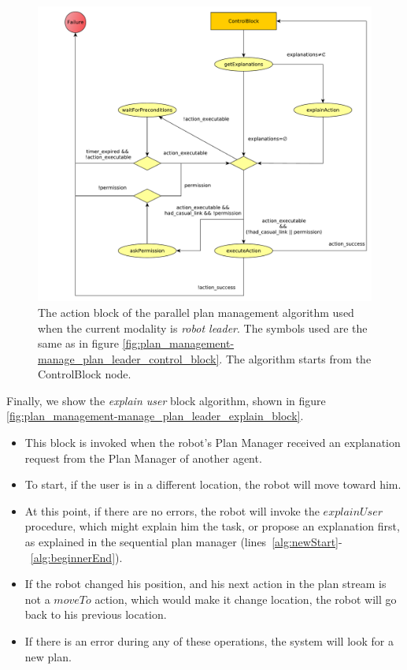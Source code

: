 \begin{figure}[ht!]
 \centering
 \includegraphics[scale=0.45]{img/plan_management/manage_plan_leader_action_block.pdf}
 \caption[The action block of the parallel plan management algorithm]{The action block of the parallel plan management algorithm used when the current modality is \textit{robot leader}. The symbols used are the same as in figure \ref{fig:plan_management-manage_plan_leader_control_block}. The algorithm starts from the ControlBlock node.}
 \label{fig:plan_management-manage_plan_leader_action_block}
 \end{figure}


Finally, we show the \textit{explain user} block algorithm, shown in figure \ref{fig:plan_management-manage_plan_leader_explain_block}.
\begin{itemize}
\item This block is invoked when the robot's Plan Manager received an explanation request from the Plan Manager of another agent.
\item To start, if the user is in a different location, the robot will move toward him.
\item At this point, if there are no errors, the robot will invoke the $explainUser$ procedure, which might explain him the task, or propose an explanation first, as explained in the sequential plan manager (lines~\ref{alg:newStart}-~\ref{alg:beginnerEnd}). 
\item If the robot changed his position, and his next action in the plan stream is not a $moveTo$ action, which would make it change location, the robot will go back to his previous location.
\item If there is an error during any of these operations, the system will look for a new plan.
\end{itemize}


